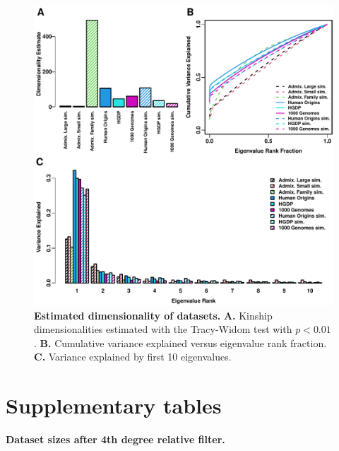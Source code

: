 \documentclass[11pt]{article}
\begin{document}
\begin{figure}[hp!]
  \centering
  \includegraphics[width=\textwidth]{eigen.pdf}
  \caption{
    {\bf Estimated dimensionality of datasets.}
    \textbf{A.}
    Kinship dimensionalities estimated with the Tracy-Widom test with $p < 0.01$.
    \textbf{B.}
    Cumulative variance explained versus eigenvalue rank fraction.
    \textbf{C.}
    Variance explained by first 10 eigenvalues.
  }
  \label{fig:eigen}
\end{figure}

\clearpage

\section{Supplementary tables}

\begin{table}[hb!]
  \centering
  \footnotesize
  \caption{
    \textbf{Dataset sizes after 4th degree relative filter.}
  }
  \label{tab:king_cutoff}
\end{table}
\end{document}
